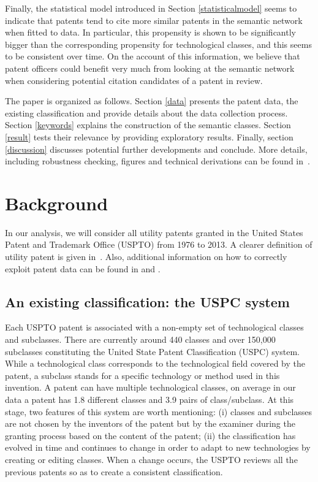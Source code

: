 \documentclass[10pt,A4,draft]{article}
\begin{document}
Finally, the statistical model introduced in Section \ref{statisticalmodel} seems to indicate that patents tend to cite more similar patents in the semantic network  when fitted to data. In particular, this propensity is shown to be significantly bigger than the corresponding propensity for technological classes, and this seems to be consistent over time. On the account of this information, we believe that patent officers could benefit very much from looking at the semantic network when considering potential citation candidates of a patent in review.

The paper is organized as follows. Section \ref{data} presents the patent data, the existing classification and provide details about the data collection process. Section \ref{keywords} explains the construction of the semantic classes. Section \ref{result} tests their relevance by providing exploratory results. Finally, section \ref{discussion} discusses potential further developments and conclude. More details, including robustness checking, figures and technical derivations can be found in~.


\section{Background \label{data}}

In our analysis, we will consider all utility patents granted in the United States Patent and Trademark Office (USPTO) from 1976 to 2013. A clearer definition of utility patent is given in~. Also, additional information on how to correctly exploit patent data can be found in \cite{Hall2001} and \cite{lerner2015use}.

\subsection{An existing classification: the USPC system}

Each USPTO patent is associated with a non-empty set of technological classes and subclasses. There are currently around 440 classes and over 150,000 subclasses constituting the United State Patent Classification (USPC) system. While a technological class corresponds to the technological field covered by the patent, a subclass stands for a specific technology or method used in this invention. A patent can have multiple technological classes, on average in our data a patent has 1.8 different classes and 3.9 pairs of class/subclass. At this stage, two features of this system are worth mentioning: (i) classes and subclasses are not chosen by the inventors of the patent but by the examiner during the granting process based on the content of the patent; (ii) the classification has evolved in time and continues to change in order to adapt to new technologies by creating or editing classes. When a change occurs, the USPTO reviews all the previous patents so as to create a consistent classification.
\end{document}
